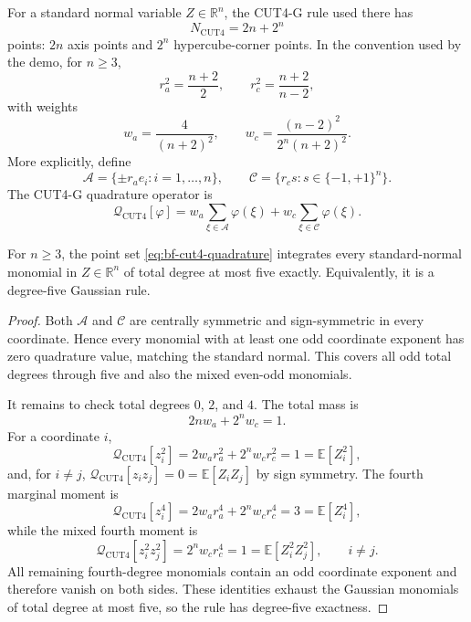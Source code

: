 For a standard normal variable $Z\in\mathbb{R}^n$, the CUT4-G rule used there
has
\[
  N_{\mathrm{CUT4}} = 2n + 2^n
\]
points: $2n$ axis points and $2^n$ hypercube-corner points.  In the convention
used by the demo, for $n\ge3$,
\[
  r_a^2=\frac{n+2}{2},\qquad
  r_c^2=\frac{n+2}{n-2},
\]
with weights
\[
  w_a=\frac{4}{(n+2)^2},\qquad
  w_c=\frac{(n-2)^2}{2^n(n+2)^2}.
\]
More explicitly, define
\[
  \mathcal A=\{\pm r_a e_i:i=1,\ldots,n\},
  \qquad
  \mathcal C=\{r_c s:s\in\{-1,+1\}^n\}.
\]
The CUT4-G quadrature operator is
\begin{equation}
\label{eq:bf-cut4-quadrature}
  \mathcal Q_{\mathrm{CUT4}}[\varphi]
  =
  w_a\sum_{\xi\in\mathcal A}\varphi(\xi)
  +w_c\sum_{\xi\in\mathcal C}\varphi(\xi).
\end{equation}

\begin{proposition}
\label{prop:bf-cut4-moment-exactness}
For $n\ge3$, the point set
\eqref{eq:bf-cut4-quadrature} integrates every standard-normal monomial in
$Z\in\mathbb R^n$ of total degree at most five exactly.  Equivalently, it is a
degree-five Gaussian rule.
\end{proposition}

\begin{proof}
Both $\mathcal A$ and $\mathcal C$ are centrally symmetric and sign-symmetric
in every coordinate.  Hence every monomial with at least one odd coordinate
exponent has zero quadrature value, matching the standard normal.  This covers
all odd total degrees through five and also the mixed even-odd monomials.

It remains to check total degrees $0$, $2$, and $4$.  The total mass is
\[
  2n w_a+2^n w_c=1 .
\]
For a coordinate $i$,
\[
  \mathcal Q_{\mathrm{CUT4}}[z_i^2]
  =
  2w_a r_a^2+2^n w_c r_c^2
  =
  1
  =
  \mathbb E[Z_i^2],
\]
and, for $i\ne j$,
$\mathcal Q_{\mathrm{CUT4}}[z_i z_j]=0=\mathbb E[Z_iZ_j]$ by sign symmetry.  The
fourth marginal moment is
\[
  \mathcal Q_{\mathrm{CUT4}}[z_i^4]
  =
  2w_a r_a^4+2^n w_c r_c^4
  =
  3
  =
  \mathbb E[Z_i^4],
\]
while the mixed fourth moment is
\[
  \mathcal Q_{\mathrm{CUT4}}[z_i^2z_j^2]
  =
  2^n w_c r_c^4
  =
  1
  =
  \mathbb E[Z_i^2Z_j^2],
  \qquad i\ne j.
\]
All remaining fourth-degree monomials contain an odd coordinate exponent and
therefore vanish on both sides.  These identities exhaust the Gaussian
monomials of total degree at most five, so the rule has degree-five exactness.
\end{proof}

